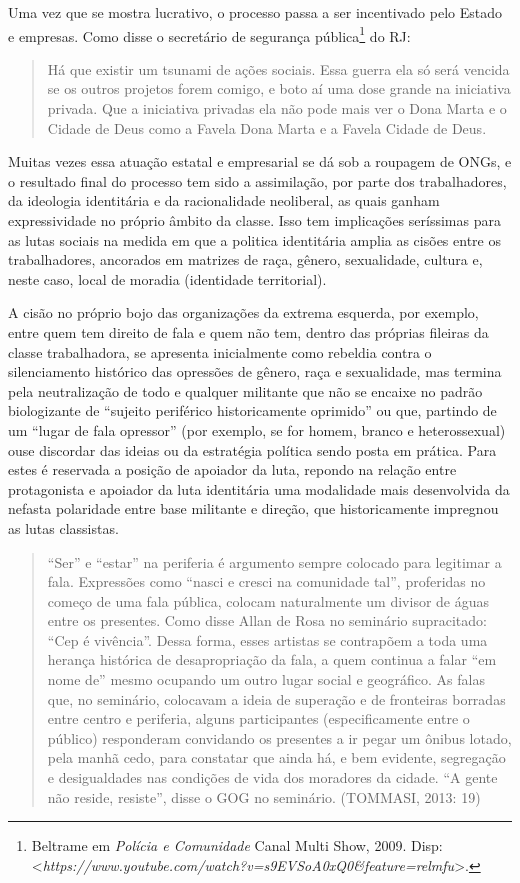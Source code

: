 Uma vez que se mostra lucrativo, o processo passa a ser incentivado pelo
Estado e empresas. Como disse o secretário de segurança
pública\footnote{Beltrame em \emph{Polícia e Comunidade} Canal Multi
  Show, 2009. Disp:
  \textless{}\emph{https://www.youtube.com/watch?v=s9EVSoA0xQ0\&feature=relmfu}\textgreater{}.} do RJ:

\begin{quote}
Há que existir um tsunami de ações sociais. Essa guerra ela só será
vencida se os outros projetos forem comigo, e boto aí uma dose grande na
iniciativa privada. Que a iniciativa privadas ela não pode mais ver o
Dona Marta e o Cidade de Deus como a Favela Dona Marta e a Favela Cidade
de Deus.
\end{quote}

Muitas vezes essa atuação estatal e empresarial se dá sob a roupagem de
ONGs, e o resultado final do processo tem sido a assimilação, por parte
dos trabalhadores, da ideologia identitária e da racionalidade
neoliberal, as quais ganham expressividade no próprio âmbito da classe.
Isso tem implicações seríssimas para as lutas sociais na medida em que a
politica identitária amplia as cisões entre os trabalhadores, ancorados
em matrizes de raça, gênero, sexualidade, cultura e, neste caso, local
de moradia (identidade territorial).

A cisão no próprio bojo das organizações da extrema esquerda, por
exemplo, entre quem tem direito de fala e quem não tem, dentro das
próprias fileiras da classe trabalhadora, se apresenta inicialmente como
rebeldia contra o silenciamento histórico das opressões de gênero, raça
e sexualidade, mas termina pela neutralização de todo e qualquer
militante que não se encaixe no padrão biologizante de ``sujeito
periférico historicamente oprimido'' ou que, partindo de um ``lugar de
fala opressor'' (por exemplo, se for homem, branco e heterossexual) ouse
discordar das ideias ou da estratégia política sendo posta em prática.
Para estes é reservada a posição de apoiador da luta, repondo na relação
entre protagonista e apoiador da luta identitária uma modalidade mais
desenvolvida da nefasta polaridade entre base militante e direção, que
historicamente impregnou as lutas classistas.

\begin{quote}
``Ser'' e ``estar'' na periferia é argumento sempre colocado para
legitimar a fala. Expressões como ``nasci e cresci na comunidade tal'',
proferidas no começo de uma fala pública, colocam naturalmente um
divisor de águas entre os presentes. Como disse Allan de Rosa no
seminário supracitado: ``Cep é vivência''. Dessa forma, esses artistas
se contrapõem a toda uma herança histórica de desapropriação da fala, a
quem continua a falar ``em nome de'' mesmo ocupando um outro lugar
social e geográfico. As falas que, no seminário, colocavam a ideia de
superação e de fronteiras borradas entre centro e periferia, alguns
participantes (especificamente entre o público) responderam convidando
os presentes a ir pegar um ônibus lotado, pela manhã cedo, para
constatar que ainda há, e bem evidente, segregação e desigualdades nas
condições de vida dos moradores da cidade. ``A gente não reside,
resiste'', disse o GOG no seminário. (TOMMASI, 2013: 19)
\end{quote}

